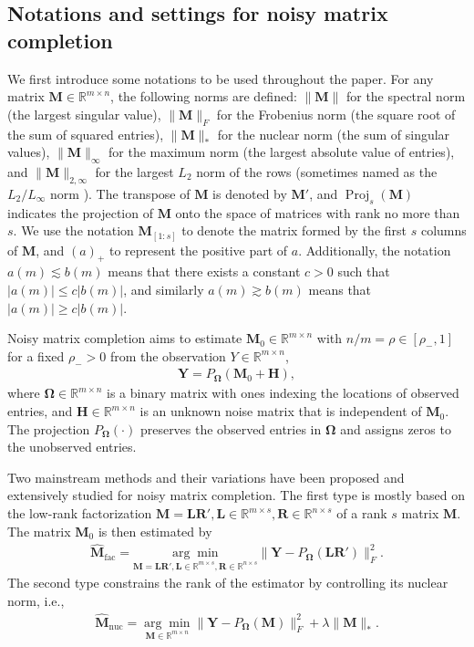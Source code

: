 \documentclass[numsec,webpdf,modern,large,namedate]{oup-authoring-template}
\theoremstyle{plain}
\theoremstyle{remark}
\newcommand{\M}{\bm{M}}
\newcommand{\bH}{\bm{H}}
\newcommand{\Y}{\bm{Y}}
\newcommand{\bOmega}{\bm{\Omega}}
\begin{document}
\subsection{Notations and settings for noisy matrix completion}
We first introduce some notations to be used throughout the paper. For any matrix $\M\in \mathbb{R}^{m\times n}$, the following norms are defined: $\|\M\|$ for the spectral norm (the largest singular value), $\|\M\|_{F}$ for the Frobenius norm (the square root of the sum of squared entries), $\|\M\|_{*}$ for the nuclear norm (the sum of singular values), $\|\M\|_{\infty}$ for the maximum norm (the largest absolute value of entries), and $\|\M\|_{2,\infty}$ for the largest $L_2$ norm of the rows (sometimes named as the $L_2/L_\infty$ norm \citep{ma2018implicit}). The transpose of $\M$ is denoted by $\M'$, and $\operatorname{Proj}_{s}(\M)$ indicates the projection of $\M$ onto the space of matrices with rank no more than $s$. We use the notation $\M_{[1:s]}$ to denote the matrix formed by the first $s$ columns of $\M$, and $(a)_{+}$ to represent the positive part of $a$. Additionally, the notation $a(m)\lesssim b(m)$ means that there exists a constant $c>0$ such that $|a(m)|\le c|b(m)|$, and similarly $a(m)\gtrsim b(m)$ means that $|a(m)|\ge c|b(m)|$.

Noisy matrix completion aims to estimate $\M_0\in \mathbb{R}^{m\times n}$ with $n/m=\rho\in[\rho_-,1]$ for a fixed $\rho_->0$ from the observation $Y\in \mathbb{R}^{m\times n}$,
\begin{align*}
\Y = P_{\bOmega}(\M_0 + \bH),
\end{align*}
where $\bOmega\in \mathbb{R}^{m\times n}$ is a binary matrix with ones indexing the locations of observed entries, and $\bH\in \mathbb{R}^{m\times n}$ is an unknown noise matrix that is independent of $\M_0$. The projection $P_{\bOmega}(\cdot)$ preserves the observed entries in $\bOmega$ and assigns zeros to the unobserved entries.


Two mainstream methods and their variations have been proposed and extensively studied for noisy matrix completion. The first type is mostly based on the low-rank factorization $\M = \bm{L}\bm{R}',\bm{L}\in \mathbb{R}^{m\times s},\bm{R}\in\mathbb{R}^{n\times s}$ of a rank $s$ matrix $\M$. The matrix $\M_0$ is then estimated by
\begin{align}
\label{eq:nonconvex-estimate}
    \widehat{\M}_{\text{fac}} = \underset{\M = \bm{L}\bm{R}',\bm{L}\in \mathbb{R}^{m\times s},\bm{R}\in\mathbb{R}^{n\times s}}{\arg \min}  \|\Y - P_{\bOmega}(\bm{L}\bm{R}')\|_{F}^2.
\end{align}
The second type constrains the rank of the estimator by controlling its nuclear norm, i.e., 
\begin{align}
\label{eq:convex-estimate}
    \widehat{\M}_{\text{nuc}} =  \underset{\M\in  \mathbb{R}^{m\times n}}{\arg \min}  \|\Y - P_{\bOmega}(\M)\|_{F}^2 +\lambda \|\M\|_{*}.
\end{align}
\end{document}
